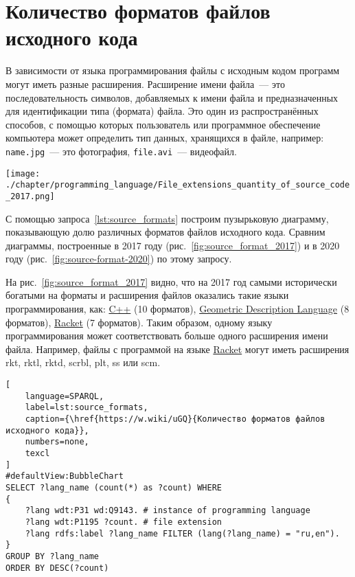 \section{Количество форматов файлов исходного кода}
В зависимости от языка программирования 
файлы с исходным кодом программ могут иметь разные расширения. 
%
Расширение имени файла~--- это последовательность символов, 
добавляемых к имени файла и предназначенных для идентификации типа (формата) файла. 
Это один из распространённых способов, 
с помощью которых пользователь или программное обеспечение компьютера может определить тип данных, 
хранящихся в файле, например: \texttt{name.jpg}~--- это фотография, \texttt{file.avi}~--- видеофайл.


\newpage
\begin{marginfigure}
\centering
	\texttt{[image: ./chapter/programming\_language/File\_extensions\_quantity\_of\_source\_code\_2017.png]}
	\label{fig:source_format_2017}
    \caption[Пузырьковая диаграмма с числом форматов файлов исходного кода для разных языков программирования, 2017 год.]{Пузырьковая диаграмма с числом форматов файлов исходного кода для разных языков программирования, 2017 год. Размер пузырька соответствует числу форматов для одного языка. Ссылка на SPARQL-запрос: \href{https://w.wiki/uGQ}{https://w.wiki/uGQ}}
\end{marginfigure}
%
С помощью запроса~\ref{lst:source_formats} построим пузырьковую диаграмму, 
показывающую долю различных форматов файлов исходного кода. 
Сравним диаграммы, построенные в 2017 году (рис.~\ref{fig:source_format_2017}) 
и в 2020 году (рис.~\ref{fig:source-format-2020}) по этому запросу. 

На рис.~\ref{fig:source_format_2017} видно, что на 2017 год самыми исторически богатыми на форматы и расширения файлов оказались такие языки программирования, как: \href{https://en.wikipedia.org/wiki/C++}{C++} (10 форматов), \href{https://en.wikipedia.org/wiki/Geometric_Description_Language}{Geometric Description Language} (8 форматов), \href{https://en.wikipedia.org/wiki/Racket_(programming_language)}{Racket} (7 форматов). Таким образом, одному языку программирования может соответствовать больше одного расширения имени файла. Например, файлы с программой на языке \href{https://en.wikipedia.org/wiki/Racket_(programming_language)}{Racket} могут иметь расширения rkt, rktl, rktd, scrbl, plt, ss или scm.

\begin{lstlisting}[
	language=SPARQL,
	label=lst:source_formats,
	caption={\href{https://w.wiki/uGQ}{Количество форматов файлов исходного кода}},
    numbers=none,
	texcl
]
#defaultView:BubbleChart
SELECT ?lang_name (count(*) as ?count) WHERE
{
    ?lang wdt:P31 wd:Q9143. # instance of programming language
 	?lang wdt:P1195 ?count. # file extension
 	?lang rdfs:label ?lang_name FILTER (lang(?lang_name) = "ru,en").
}
GROUP BY ?lang_name 
ORDER BY DESC(?count)
\end{lstlisting}


